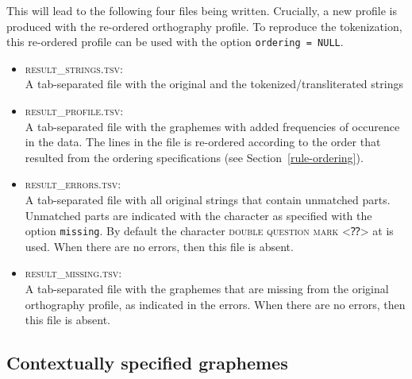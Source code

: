 \documentclass[output=inprep,
		biblatex
		]{LSP/langsci}\usepackage[]{graphicx}\usepackage[]{color}
\begin{document}
This will lead to the following four files being written. Crucially, a
new profile is produced with the re-ordered orthography profile. To reproduce
the tokenization, this re-ordered profile can be used with the option
\texttt{ordering~=~NULL}.

\begin{itemize}
  
   \item \textsc{result\_strings.tsv}:\\ A tab-separated file with the original
         and the tokenized/transliterated strings

   \item \textsc{result\_profile.tsv}:\\ A tab-separated file with the
         graphemes with added frequencies of occurence in the data. The lines
         in the file is re-ordered according to the order that resulted from the
         ordering specifications (see Section~\ref{rule-ordering}).

   \item \textsc{result\_errors.tsv}:\\ A tab-separated file with all original
         strings that contain unmatched parts. Unmatched parts are indicated
         with the character as specified with the option \texttt{missing}. By
         default the character \textsc{double question mark} <⁇> at
          is used. When there are no errors, then this file is 
         absent.

    \item \textsc{result\_missing.tsv}:\\ A tab-separated file with the graphemes
          that are missing from the original orthography profile, as indicated in
          the errors. When there are no errors, then this file is absent.
          
\end{itemize}

\subsection*{Contextually specified graphemes}
\label{contextual-specification}
\end{document}
